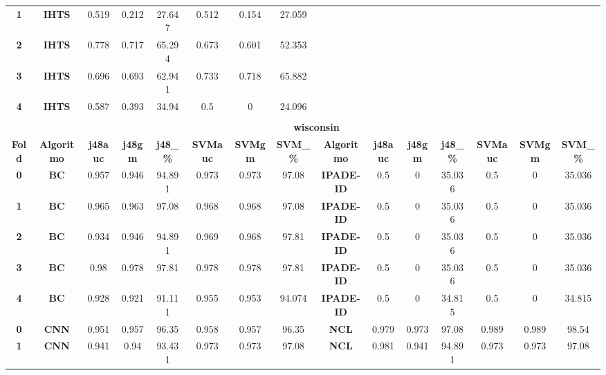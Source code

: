 {{\begin{tabular}{c|c|cccccc|ccccccc}
\textbf{1} & \textbf{IHTS} & 0.519 & 0.212 & 27.647 & 0.512 & 0.154 & 27.059 &       &       &       &       &       &       &  \\
\textbf{2} & \textbf{IHTS} & 0.778 & 0.717 & 65.294 & 0.673 & 0.601 & 52.353 &       &       &       &       &       &       &  \\
\textbf{3} & \textbf{IHTS} & 0.696 & 0.693 & 62.941 & 0.733 & 0.718 & 65.882 &       &       &       &       &       &       &  \\
\textbf{4} & \textbf{IHTS} & 0.587 & 0.393 & 34.94 & 0.5   & 0     & 24.096 &       &       &       &       &       &       &  \\
\multicolumn{1}{c}{} & \multicolumn{1}{c}{} &       &       &       &       &       & \multicolumn{1}{c}{} &       &       &       &       &       &       &  \\
\multicolumn{1}{c}{} & \multicolumn{14}{c}{\textbf{wisconsin}} \\
\midrule
\textbf{Fold} & \textbf{Algoritmo} & \textbf{j48auc} & \textbf{j48gm} & \textbf{j48\_\%} & \textbf{SVMauc} & \textbf{SVMgm} & \textbf{SVM\_\%} & \multicolumn{1}{c|}{\textbf{Algoritmo}} & \textbf{j48auc} & \textbf{j48gm} & \textbf{j48\_\%} & \textbf{SVMauc} & \textbf{SVMgm} & \textbf{SVM\_\%} \\
\midrule
\textbf{0} & \textbf{BC} & 0.957 & 0.946 & 94.891 & 0.973 & 0.973 & 97.08 & \multicolumn{1}{c|}{\textbf{IPADE-ID}} & 0.5   & 0     & 35.036 & 0.5   & 0     & 35.036 \\
\textbf{1} & \textbf{BC} & 0.965 & 0.963 & 97.08 & 0.968 & 0.968 & 97.08 & \multicolumn{1}{c|}{\textbf{IPADE-ID}} & 0.5   & 0     & 35.036 & 0.5   & 0     & 35.036 \\
\textbf{2} & \textbf{BC} & 0.934 & 0.946 & 94.891 & 0.969 & 0.968 & 97.81 & \multicolumn{1}{c|}{\textbf{IPADE-ID}} & 0.5   & 0     & 35.036 & 0.5   & 0     & 35.036 \\
\textbf{3} & \textbf{BC} & 0.98  & 0.978 & 97.81 & 0.978 & 0.978 & 97.81 & \multicolumn{1}{c|}{\textbf{IPADE-ID}} & 0.5   & 0     & 35.036 & 0.5   & 0     & 35.036 \\
\textbf{4} & \textbf{BC} & 0.928 & 0.921 & 91.111 & 0.955 & 0.953 & 94.074 & \multicolumn{1}{c|}{\textbf{IPADE-ID}} & 0.5   & 0     & 34.815 & 0.5   & 0     & 34.815 \\
\textbf{0} & \textbf{CNN} & 0.951 & 0.957 & 96.35 & 0.958 & 0.957 & 96.35 & \multicolumn{1}{c|}{\textbf{NCL}} & 0.979 & 0.973 & 97.08 & 0.989 & 0.989 & 98.54 \\
\textbf{1} & \textbf{CNN} & 0.941 & 0.94  & 93.431 & 0.973 & 0.973 & 97.08 & \multicolumn{1}{c|}{\textbf{NCL}} & 0.981 & 0.941 & 94.891 & 0.973 & 0.973 & 97.08 \\

\end{tabular}}}
